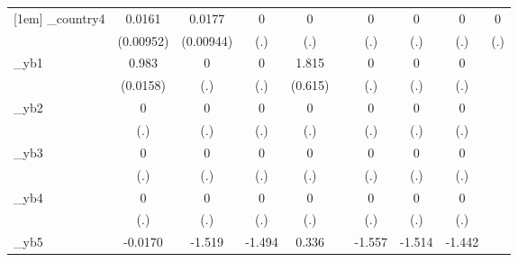 \begin{table}[htbp]
\begin{tabular}{l*{9}{c}}
[1em]
\_country4   &      0.0161\sym{*}  &      0.0177\sym{*}  &           0         &           0         &                     &           0         &           0         &           0         &           0         \\
            &   (0.00952)         &   (0.00944)         &         (.)         &         (.)         &                     &         (.)         &         (.)         &         (.)         &         (.)         \\
[1em]
\_yb1        &       0.983\sym{***}&           0         &           0         &       1.815\sym{***}&                     &           0         &           0         &           0         &                     \\
            &    (0.0158)         &         (.)         &         (.)         &     (0.615)         &                     &         (.)         &         (.)         &         (.)         &                     \\
[1em]
\_yb2        &           0         &           0         &           0         &           0         &                     &           0         &           0         &           0         &                     \\
            &         (.)         &         (.)         &         (.)         &         (.)         &                     &         (.)         &         (.)         &         (.)         &                     \\
[1em]
\_yb3        &           0         &           0         &           0         &           0         &                     &           0         &           0         &           0         &                     \\
            &         (.)         &         (.)         &         (.)         &         (.)         &                     &         (.)         &         (.)         &         (.)         &                     \\
[1em]
\_yb4        &           0         &           0         &           0         &           0         &                     &           0         &           0         &           0         &                     \\
            &         (.)         &         (.)         &         (.)         &         (.)         &                     &         (.)         &         (.)         &         (.)         &                     \\
[1em]
\_yb5        &     -0.0170         &      -1.519\sym{***}&      -1.494\sym{***}&       0.336         &                     &      -1.557\sym{***}&      -1.514\sym{***}&      -1.442\sym{***}&                     \\

\end{tabular}
\end{table}
